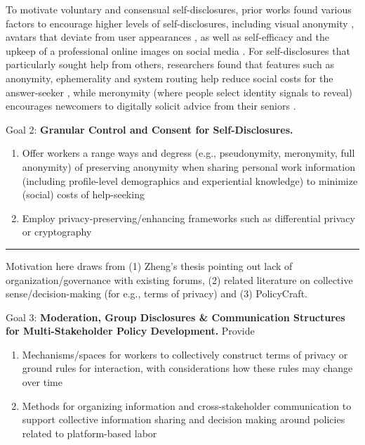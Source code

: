 
To motivate voluntary and consensual self-disclosures, prior works found various factors to encourage higher levels of self-disclosures, including visual anonymity \cite{awareness}, avatars that deviate from user appearances \cite{avatar}, as well as self-efficacy and the upkeep of a professional online images on social media \cite{predictors}. For self-disclosures that particularly sought help from others, researchers found that features such as anonymity, ephemerality and system routing help reduce social costs for the answer-seeker \citep{socialcost}, while meronymity (where people select identity signals to reveal) encourages newcomers to digitally solicit advice from their seniors \cite{meronymity}. 

Goal 2: \textbf{Granular Control and Consent for Self-Disclosures.} 
    \begin{enumerate}
        \item Offer workers a range ways and degress (e.g., pseudonymity, meronymity, full anonymity) of preserving anonymity when sharing personal work information (including profile-level demographics and experiential knowledge) to minimize (social) costs of help-seeking 
        \item Employ privacy-preserving/enhancing frameworks such as differential privacy or cryptography
    \end{enumerate}
\rule{\linewidth}{0.5mm}
Motivation here draws from (1) Zheng's thesis pointing out lack of organization/governance with existing forums, (2) related literature on collective sense/decision-making (for e.g., terms of privacy) and (3) PolicyCraft.

Goal 3: \textbf{Moderation, Group Disclosures \& Communication Structures for Multi-Stakeholder Policy Development.} Provide
    \begin{enumerate}
        \item Mechanisms/spaces for workers to collectively construct terms of privacy or ground rules for interaction, with considerations how these rules may change over time
        \item Methods for organizing information and cross-stakeholder communication to support collective information sharing and decision making around policies related to platform-based labor
    \end{enumerate}

